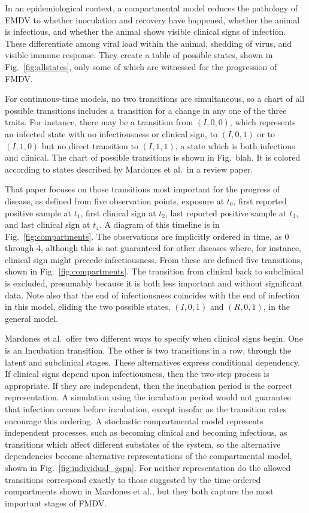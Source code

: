 \documentclass{article}
\begin{document}
In an epidemiological context, a compartmental model reduces
the pathology of FMDV to whether inoculation and recovery have happened,
whether the animal is infectious, and whether the animal shows
visible clinical signs of infection. These differentiate among
viral load within the animal, shedding of virus, and visible
immune response. They create a table of possible states, shown
in Fig.~\ref{fig:allstates},
only some of which are witnessed for the progression of FMDV.

For continuous-time models, no two transitions are simultaneous,
so a chart of all possible transitions includes a transition
for a change in any one of the three traits. For instance,
there may be a transition from $(I,0,0)$, which represents
an infected state with no infectiousness or clinical sign,
to $(I,0,1)$ or to $(I,1,0)$ but no direct transition to $(I,1,1)$,
a state which is both infectious and clinical. The chart
of possible transitions is shown in Fig.~blah.
It is colored according to states described by Mardones
et al.\ in a review paper.

That paper focuses on those transitions most important for
the progress of disease, as defined from five observation
points, exposure at $t_0$, first reported positive sample
at $t_1$, first clinical sign at $t_2$, last reported positive sample at $t_3$,
and last clinical sign at $t_4$. A diagram of this timeline is
in Fig.~\ref{fig:compartments}.
The observations are implicitly ordered in time, as 0 through 4,
although this is not guaranteed for other diseases where, for instance,
clinical sign might precede infectiousness.
From these are defined five transitions, shown in Fig.~\ref{fig:compartments}.
The transition from clinical back to subclinical is excluded,
presumably because it is both less important and without
significant data. Note also that the end of infectiousness
coincides with the end of infection in this model, eliding
the two possible states, $(I,0,1)$ and $(R,0,1)$, in the
general model.

Mardones et al.\ offer two different ways to specify
when clinical signs begin. One is an Incubation transition. The
other is two transitions in a row, through the latent and subclinical
stages. These alternatives express conditional dependency.
If clinical signs depend upon infectiousness, then the two-step
process is appropriate. If they are independent, then the incubation
period is the correct representation. A simulation using
the incubation period would not guarantee that
infection occurs before incubation, except insofar as
the transition rates encourage this ordering.
A stochastic compartmental model represents independent
processes, such as becoming clinical and becoming
infectious, as transitions which affect different substates
of the system, so the alternative dependencies become
alternative representations of the compartmental model,
shown in Fig.~\ref{fig:individual_gspn}.
For neither representation do the allowed transitions correspond
exactly to those suggested by the time-ordered compartments
shown in Mardones et al., but they both capture
the most important stages of FMDV.
\end{document}
